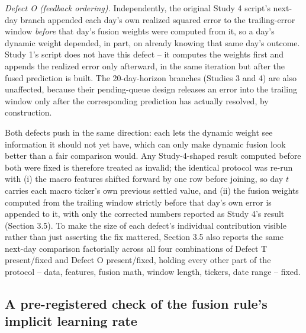 \documentclass[10pt,a4paper,twocolumn]{article}
\begin{document}
\textit{Defect O (feedback ordering).} Independently, the original Study 4 script's next-day branch appended each day's own realized squared error to the trailing-error window \emph{before} that day's fusion weights were computed from it, so a day's dynamic weight depended, in part, on already knowing that same day's outcome. Study 1's script does not have this defect -- it computes the weights first and appends the realized error only afterward, in the same iteration but after the fused prediction is built. The 20-day-horizon branches (Studies 3 and 4) are also unaffected, because their pending-queue design releases an error into the trailing window only after the corresponding prediction has actually resolved, by construction.

Both defects push in the same direction: each lets the dynamic weight see information it should not yet have, which can only make dynamic fusion look better than a fair comparison would. Any Study-4-shaped result computed before both were fixed is therefore treated as invalid; the identical protocol was re-run with (i) the macro features shifted forward by one row before joining, so day $t$ carries each macro ticker's own previous settled value, and (ii) the fusion weights computed from the trailing window strictly before that day's own error is appended to it, with only the corrected numbers reported as Study 4's result (Section 3.5). To make the size of each defect's individual contribution visible rather than just asserting the fix mattered, Section 3.5 also reports the same next-day comparison factorially across all four combinations of Defect T present/fixed and Defect O present/fixed, holding every other part of the protocol -- data, features, fusion math, window length, tickers, date range -- fixed.

\subsection{A pre-registered check of the fusion rule's implicit learning rate}
\label{sec:etacheck}
\end{document}
